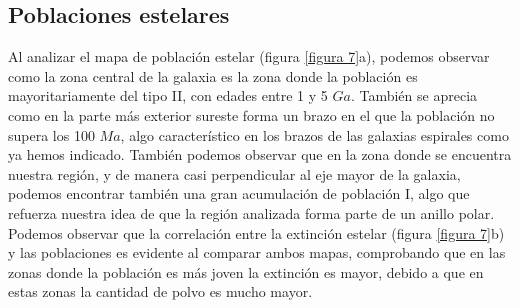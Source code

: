 \documentclass{article}
\begin{document}
\subsection{Poblaciones estelares}
Al analizar el mapa de población estelar (figura \ref{figura 7}a), podemos observar como la zona central de la galaxia es la zona donde la población es mayoritariamente del tipo II, con edades entre 1 y 5 $Ga$. También se aprecia como en la parte más exterior sureste forma un brazo en el que la población no supera los 100 $Ma$, algo característico en los brazos de las galaxias espirales como ya hemos indicado. También podemos observar que en la zona donde se encuentra nuestra región, y de manera casi perpendicular al eje mayor de la galaxia, podemos encontrar también una gran acumulación de población I, algo que refuerza nuestra idea de que la región analizada forma parte de un anillo polar.\\Podemos observar que la correlación entre la extinción estelar (figura \ref{figura 7}b) y las poblaciones es evidente al comparar ambos mapas, comprobando que en las zonas donde la población es más joven la extinción es mayor, debido a que en estas zonas la cantidad de polvo es mucho mayor.
\end{document}
